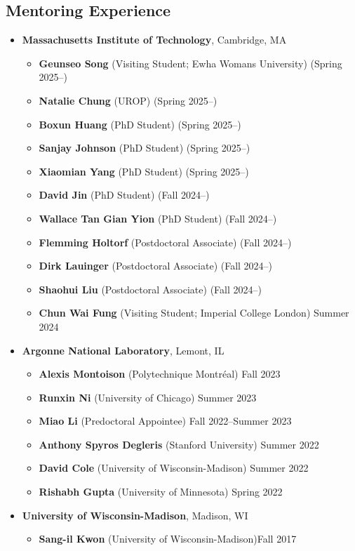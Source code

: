 \message{ !name(shin-abet.tex)}\documentclass[letterpaper, 11pt]{article}
\begin{document}
\subsection*{Mentoring Experience}
\begin{itemize}[itemsep=1pt, parsep=0pt,leftmargin=*]
  \item[] \textbf{Massachusetts Institute of Technology}, Cambridge, MA
  \begin{itemize}[itemsep=1pt, parsep=0pt,leftmargin=*]
    \item[] \textbf{Geunseo Song} (Visiting Student; Ewha Womans University) \hfill (Spring 2025--)
    \item[] \textbf{Natalie Chung} (UROP) \hfill (Spring 2025--)
    \item[] \textbf{Boxun Huang} (PhD Student) \hfill (Spring 2025--)
    \item[] \textbf{Sanjay Johnson} (PhD Student) \hfill (Spring 2025--)
    \item[] \textbf{Xiaomian Yang} (PhD Student) \hfill (Spring 2025--)
    \item[] \textbf{David Jin} (PhD Student) \hfill (Fall 2024--)
    \item[] \textbf{Wallace Tan Gian Yion} (PhD Student) \hfill (Fall 2024--)
    \item[] \textbf{Flemming Holtorf} (Postdoctoral Associate) \hfill (Fall 2024--)
    \item[] \textbf{Dirk Lauinger} (Postdoctoral Associate) \hfill (Fall 2024--)
    \item[] \textbf{Shaohui Liu} (Postdoctoral Associate) \hfill (Fall 2024--)
    \item[] \textbf{Chun Wai Fung} (Visiting Student; Imperial College London) \hfill Summer 2024
  \end{itemize}
\item[] \textbf{Argonne National Laboratory}, Lemont, IL
  \begin{itemize}[itemsep=1pt, parsep=0pt,leftmargin=*]
  \item[] \textbf{Alexis Montoison} (Polytechnique Montr\'{e}al) \hfill Fall 2023
  \item[] \textbf{Runxin Ni} (University of Chicago) \hfill Summer 2023
  \item[] \textbf{Miao Li} (Predoctoral Appointee) \hfill Fall 2022--Summer 2023
  \item[] \textbf{Anthony Spyros Degleris} (Stanford University) \hfill Summer 2022
  \item[] \textbf{David Cole} (University of Wisconsin-Madison) \hfill Summer 2022
  \item[] \textbf{Rishabh Gupta} (University of Minnesota) \hfill Spring 2022
  \end{itemize}
\item[] \textbf{University of Wisconsin-Madison}, Madison, WI
  \begin{itemize}[itemsep=1pt, parsep=0pt,leftmargin=*]
  \item[] \textbf{Sang-il Kwon} (University of Wisconsin-Madison)\hfill Fall 2017
  \end{itemize}
\end{itemize}
\end{document}
